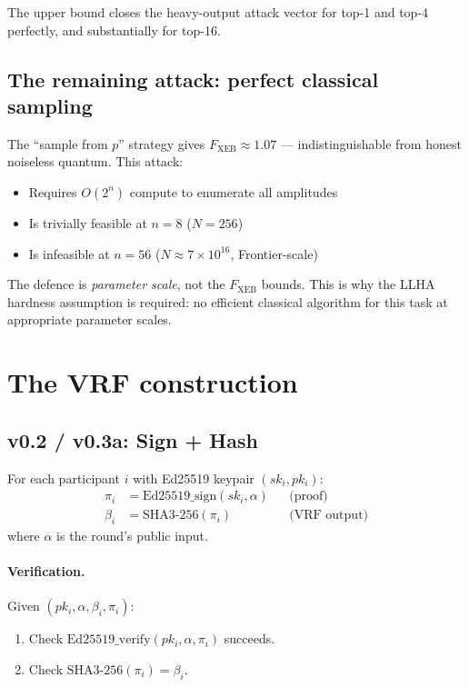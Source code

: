 \documentclass[11pt,a4paper]{article}
\theoremstyle{plain}
\theoremstyle{definition}
\theoremstyle{remark}
\begin{document}
The upper bound closes the heavy-output attack vector for top-1 and top-4 perfectly, and substantially for top-16.

\subsection{The remaining attack: perfect classical sampling}

The ``sample from $p$'' strategy gives $F_{\mathrm{XEB}} \approx 1.07$ --- indistinguishable from honest noiseless quantum. This attack:
\begin{itemize}[itemsep=2pt,topsep=2pt]
  \item Requires $O(2^n)$ compute to enumerate all amplitudes
  \item Is trivially feasible at $n=8$ ($N=256$)
  \item Is infeasible at $n=56$ ($N \approx 7 \times 10^{16}$, Frontier-scale)
\end{itemize}

The defence is \emph{parameter scale}, not the $F_{\mathrm{XEB}}$ bounds. This is why the LLHA hardness assumption is required: no efficient classical algorithm for this task at appropriate parameter scales.

\section{The VRF construction}

\subsection{v0.2 / v0.3a: Sign + Hash}

For each participant $i$ with Ed25519 keypair $(sk_i, pk_i)$:
\begin{align}
\pi_i &= \mathrm{Ed25519\_sign}(sk_i, \alpha) && \text{(proof)} \\
\beta_i &= \mathrm{SHA3\text{-}256}(\pi_i) && \text{(VRF output)}
\end{align}
where $\alpha$ is the round's public input.

\paragraph{Verification.} Given $(pk_i, \alpha, \beta_i, \pi_i)$:
\begin{enumerate}[itemsep=2pt,topsep=2pt]
  \item Check $\mathrm{Ed25519\_verify}(pk_i, \alpha, \pi_i)$ succeeds.
  \item Check $\mathrm{SHA3\text{-}256}(\pi_i) = \beta_i$.
\end{enumerate}
\end{document}
